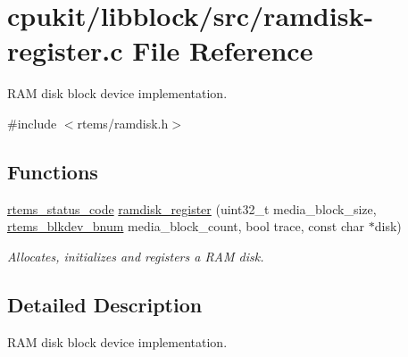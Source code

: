 \hypertarget{ramdisk-register_8c}{}\section{cpukit/libblock/src/ramdisk-\/register.c File Reference}
\label{ramdisk-register_8c}


R\+AM disk block device implementation.  


{\ttfamily \#include $<$rtems/ramdisk.\+h$>$}\newline
\subsection*{Functions}
\begin{DoxyCompactItemize}
\item 
\mbox{\hyperlink{group__ClassicStatus_ga545d41846817eaba6143d52ee4d9e9fe}{rtems\+\_\+status\+\_\+code}} \mbox{\hyperlink{group__rtems__ramdisk_ga22e8a306b2cac6ab0dd029788e33641e}{ramdisk\+\_\+register}} (uint32\+\_\+t media\+\_\+block\+\_\+size, \mbox{\hyperlink{group__rtems__disk_ga5fbcfd40b657bff6c54d9e393fab3274}{rtems\+\_\+blkdev\+\_\+bnum}} media\+\_\+block\+\_\+count, bool trace, const char $\ast$disk)
\begin{DoxyCompactList}\small\item\em Allocates, initializes and registers a R\+AM disk. \end{DoxyCompactList}\end{DoxyCompactItemize}


\subsection{Detailed Description}
R\+AM disk block device implementation. 

